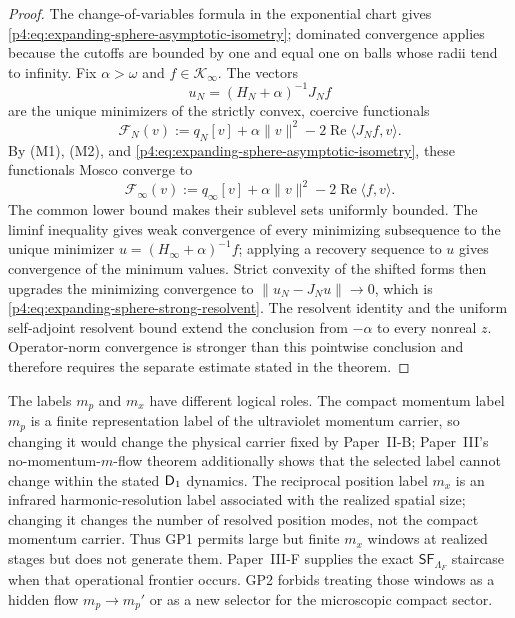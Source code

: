 \documentclass[12pt,a4paper]{article}
\begin{document}
\begin{proof}
The change-of-variables formula in the exponential chart gives
\eqref{p4:eq:expanding-sphere-asymptotic-isometry}; dominated convergence
applies because the cutoffs are bounded by one and equal one on balls whose
radii tend to infinity.  Fix \(\alpha>\omega\) and \(f\in\mathcal K_\infty\).
The vectors
\[
 u_N=(H_N+\alpha)^{-1}J_Nf
\]
are the unique minimizers of the strictly convex, coercive functionals
\[
 \mathcal F_N(v)
 :=q_N[v]+\alpha\lVert v\rVert^2
 -2\operatorname{Re}\langle J_Nf,v\rangle.
\]
By (M1), (M2), and
\eqref{p4:eq:expanding-sphere-asymptotic-isometry}, these functionals Mosco
converge to
\[
 \mathcal F_\infty(v)
 :=q_\infty[v]+\alpha\lVert v\rVert^2
 -2\operatorname{Re}\langle f,v\rangle.
\]
The common lower bound makes their sublevel sets uniformly bounded.  The
liminf inequality gives weak convergence of every minimizing subsequence to
the unique minimizer
\(u=(H_\infty+\alpha)^{-1}f\); applying a recovery sequence to \(u\) gives
convergence of the minimum values.  Strict convexity of the shifted forms
then upgrades the minimizing convergence to
\(\lVert u_N-J_Nu\rVert\to0\), which is
\eqref{p4:eq:expanding-sphere-strong-resolvent}.  The resolvent identity and
the uniform self-adjoint resolvent bound extend the conclusion from
\(-\alpha\) to every nonreal \(z\).  Operator-norm convergence is stronger
than this pointwise conclusion and therefore requires the separate estimate
stated in the theorem.
\end{proof}

\begin{remark}
\label{p4:rem:mp-mx-selection-status}
The labels \(m_p\) and \(m_x\) have different logical roles.  The compact
momentum label \(m_p\) is a finite representation label of the ultraviolet
momentum carrier, so changing it would change the physical carrier fixed by
Paper~II-B; Paper~III's no-momentum-\(m\)-flow theorem additionally shows that
the selected label cannot change within the stated \(\mathsf{D}_1\) dynamics.  The reciprocal
position label \(m_x\) is an infrared harmonic-resolution label associated
with the realized spatial size; changing it changes the number of resolved
position modes, not the compact momentum carrier.  Thus GP1 permits large but
finite \(m_x\) windows at realized stages but does not generate them.
Paper~III-F supplies the exact \(\mathsf{SF}_{\Lambda_F}\) staircase when that
operational frontier occurs.  GP2 forbids treating those windows as a hidden
flow \(m_p\to m_p'\) or as a new selector for the microscopic compact sector.
\end{remark}
\end{document}
